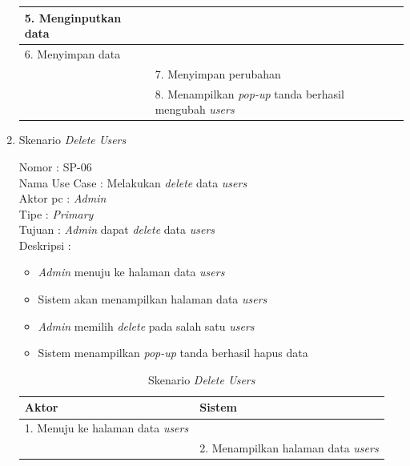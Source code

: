 \begin{enumerate}
\begin{table}
\begin{tabular}{ | l | p{65mm} |}
		\hline
		
		5.	Menginputkan data  & \\
		\hline
		
		6.	Menyimpan data & \\
		\hline
		
		& 7.	Menyimpan perubahan \\
		\hline
		
		& 8.	Menampilkan \textit{pop-up} tanda berhasil mengubah \textit{users} \\
		\hline
		
	\end{tabular}
\end{table}

\item Skenario \textit{Delete Users}

Nomor \kern 3.6pc : SP-06 \\
Nama Use Case : Melakukan \textit{delete} data \textit{users} \\
Aktor  pc : \textit{Admin} \\
Tipe \kern 4.6pc : \textit{Primary} \\
Tujuan \kern 3.6pc : \textit{Admin} dapat \textit{delete} data \textit{users} \\
Deskripsi \kern 2.5pc : 

\begin{itemize}
	\item \textit{Admin} menuju ke halaman data \textit{users}
	\item Sistem akan menampilkan halaman data \textit{users}
	\item \textit{Admin} memilih \textit{delete} pada salah satu \textit{users}
	\item Sistem menampilkan \textit{pop-up} tanda berhasil hapus data
	
\end{itemize}

\begin{table}
	\caption{Skenario \textit{Delete Users}}
	\centering
	\begin{tabular}{ | l | p{65mm} |}
		\hline 
		\textbf{Aktor} & \textbf{Sistem} \\
		\hline
		
		1.	Menuju ke halaman data \textit{users} &  \\
		
		\hline
		
		&  2.	Menampilkan halaman data \textit{users} \\
		

\end{tabular}
\end{table}
\end{enumerate}
